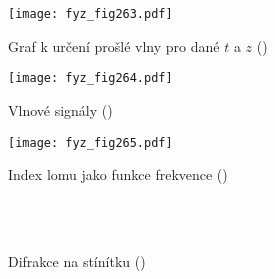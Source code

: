     \begin{figure}[ht!] %
      \centering
      \texttt{[image: fyz\_fig263.pdf]}
      \caption{Graf k určení prošlé vlny pro dané \(t\) a \(z\)
               (\cite[s.~413]{Feynman01})}
      \label{fyz:fig263}
    \end{figure}
    
    \begin{figure}[ht!] %
      \centering
      \texttt{[image: fyz\_fig264.pdf]}
      \caption{Vlnové signály
               (\cite[s.~418]{Feynman01})}
      \label{fyz:fig264}
    \end{figure}

    \begin{figure}[ht!] %
      \centering
      \texttt{[image: fyz\_fig265.pdf]}
      \caption{Index lomu jako funkce frekvence
               (\cite[s.~419]{Feynman01})}
      \label{fyz:fig265}
    \end{figure}
    

    \begin{figure}[ht!]  %
      \centering
                     \\
                     \\
      \caption{Difrakce na stínítku
               (\cite[s.~422]{Feynman01})}
      \label{fyz:fig266}
    \end{figure}

